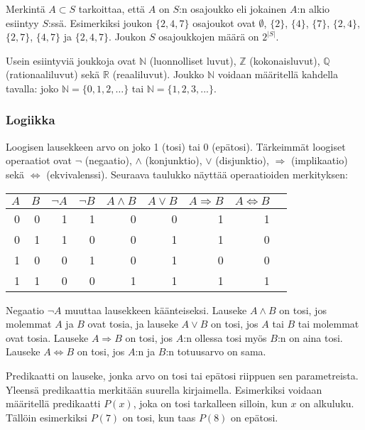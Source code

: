 Merkintä $A \subset S$ tarkoittaa,
että $A$ on $S$:n osajoukko
eli jokainen $A$:n alkio esiintyy $S$:ssä.
Esimerkiksi joukon $\{2,4,7\}$
osajoukot ovat $\emptyset$,
$\{2\}$, $\{4\}$, $\{7\}$, $\{2,4\}$, $\{2,7\}$, $\{4,7\}$ ja $\{2,4,7\}$.
Joukon $S$ osajoukkojen määrä on $2^{|S|}$.

Usein esiintyviä joukkoja ovat
$\mathbb{N}$ (luonnolliset luvut),
$\mathbb{Z}$ (kokonaisluvut),
$\mathbb{Q}$ (rationaaliluvut) sekä
$\mathbb{R}$ (reaaliluvut).
Joukko $\mathbb{N}$ voidaan määritellä
kahdella tavalla: joko $\mathbb{N}=\{0,1,2,\ldots\}$
tai $\mathbb{N}=\{1,2,3,...\}$.

\subsubsection{Logiikka}


Loogisen lausekkeen arvo on joko 1 (tosi) tai 0 (epätosi).
Tärkeimmät loogiset operaatiot ovat
$\lnot$ (negaatio),
$\land$ (konjunktio),
$\lor$ (disjunktio),
$\Rightarrow$ (implikaatio) sekä
$\Leftrightarrow$ (ekvivalenssi).
Seuraava taulukko näyttää operaatioiden merkityksen:

\begin{center}
\begin{tabular}{rr|rrrrrrr}
$A$ & $B$ & $\lnot A$ & $\lnot B$ & $A \land B$ & $A \lor B$ & $A \Rightarrow B$ & $A \Leftrightarrow B$ \\
\hline
0 & 0 & 1 & 1 & 0 & 0 & 1 & 1 \\
0 & 1 & 1 & 0 & 0 & 1 & 1 & 0 \\
1 & 0 & 0 & 1 & 0 & 1 & 0 & 0 \\
1 & 1 & 0 & 0 & 1 & 1 & 1 & 1 \\
\end{tabular}
\end{center}

Negaatio $\lnot A$ muuttaa lausekkeen käänteiseksi.
Lauseke $A \land B$ on tosi, jos molemmat $A$ ja $B$ ovat tosia,
ja lauseke $A \lor B$ on tosi, jos $A$ tai $B$ tai molemmat
ovat tosia.
Lauseke $A \Rightarrow B$ on tosi,
jos $A$:n ollessa tosi myös $B$:n on aina tosi.
Lauseke $A \Leftrightarrow B$ on tosi,
jos $A$:n ja $B$:n totuusarvo on sama.

Predikaatti on lauseke, jonka arvo on tosi tai epätosi
riippuen sen parametreista.
Yleensä predikaattia merkitään suurella kirjaimella.
Esimerkiksi voidaan määritellä predikaatti $P(x)$,
joka on tosi tarkalleen silloin, kun $x$ on alkuluku.
Tällöin esimerkiksi $P(7)$ on tosi, kun taas $P(8)$ on epätosi.

